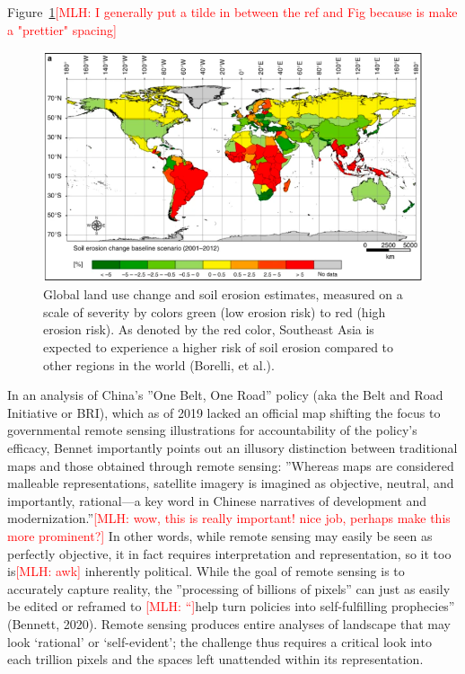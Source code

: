 \documentclass{book}\usepackage{knitr}
\newcommand{\red}[1]{\textcolor{red}{[MLH: #1]}}
\begin{document}
Figure~\ref{fig:Bonelli Erosion Map}\red{I generally put a tilde in between the ref and Fig because is make a "prettier" spacing}

\begin{figure}
\includegraphics[width=\linewidth]{images/land-use/Bonelli_Erosion_Map.png}
\caption{Global land use change and soil erosion estimates, measured on a scale of severity by colors green (low erosion risk) to red (high erosion risk). As denoted by the red color, Southeast Asia is expected to experience a higher risk of soil erosion compared to other regions in the world (Borelli, et al.).}
\label{fig:Bonelli Erosion Map}
\end{figure}

In an analysis of China’s ''One Belt, One Road'' policy (aka the Belt and Road Initiative or BRI), which as of 2019 lacked an official map shifting the focus to governmental remote sensing illustrations for accountability of the policy’s efficacy, Bennet importantly points out an illusory distinction between traditional maps and those obtained through remote sensing: ''Whereas maps are considered malleable representations, satellite imagery is imagined as objective, neutral, and importantly, rational—a key word in Chinese narratives of development and modernization.''\red{wow, this is really important! nice job, perhaps make this more prominent?} In other words, while remote sensing may easily be seen as perfectly objective, it in fact requires interpretation and representation, so it too is\red{awk} inherently political. While the goal of remote sensing is to accurately capture reality, the ''processing of billions of pixels'' can just as easily be edited or reframed to \red{“}help turn policies into self-fulfilling prophecies” (Bennett, 2020). Remote sensing produces entire analyses of landscape that may look ‘rational’ or ‘self-evident’; the challenge thus requires a critical look into each trillion pixels and the spaces left unattended within its representation.
\end{document}
